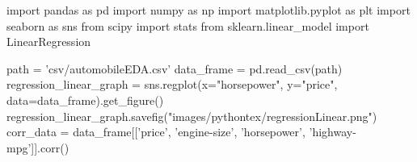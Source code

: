 \begin{pycode}
import pandas as pd
import numpy as np
import matplotlib.pyplot as plt
import seaborn as sns
from scipy import stats
from sklearn.linear_model import LinearRegression

path = 'csv/automobileEDA.csv'
data_frame = pd.read_csv(path)
regression_linear_graph = sns.regplot(x="horsepower", y="price", data=data_frame).get_figure()
regression_linear_graph.savefig("images/pythontex/regressionLinear.png")
corr_data = data_frame[['price', 'engine-size', 'horsepower', 'highway-mpg']].corr()
\end{pycode}